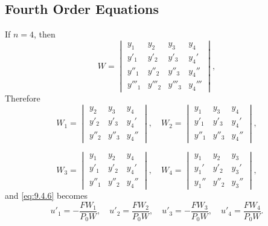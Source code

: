 \documentclass{ximera}
\begin{document}
\subsection*{Fourth Order Equations}

If $n=4$, then
$$
W=\begin{vmatrix}
y_1&y_2&y_3&y_4 \\
y'_1&y'_2&y'_3&y_4' \\
y''_1&y''_2&y''_3&y_4''\\
y'''_1&y'''_2&y'''_3&y_4'''
 \end{vmatrix},
$$
Therefore
$$
W_1=\begin{vmatrix}
y_2&y_3&y_4 \\
y'_2&y'_3&y_4'\\
y''_2&y''_3&y_4''
\end{vmatrix},
\quad W_2=\begin{vmatrix}
y_1&y_3&y_4 \\
y'_1&y'_3&y_4'\\
y''_1&y''_3&y_4''
 \end{vmatrix},
$$

$$
 W_3=\begin{vmatrix}
y_1&y_2&y_4 \\
y'_1&y'_2&y_4'\\
y''_1&y''_2&y_4''
 \end{vmatrix},\quad
 W_4=\begin{vmatrix}
y_1&y_2&y_3 \\
y_1'&y'_2&y_3'\\
y_1''&y''_2&y_3''
 \end{vmatrix},
$$
and  \eqref{eq:9.4.6}  becomes
\begin{equation} \label{eq:9.4.9}
u'_1=-\frac{FW_1}{P_0W},\quad u'_2=\frac{FW_2}{P_0W},\quad
u'_3=-\frac{FW_3}{P_0W},\quad u'_4=\frac{FW_4}{P_0W}.
\end{equation}
\end{document}
